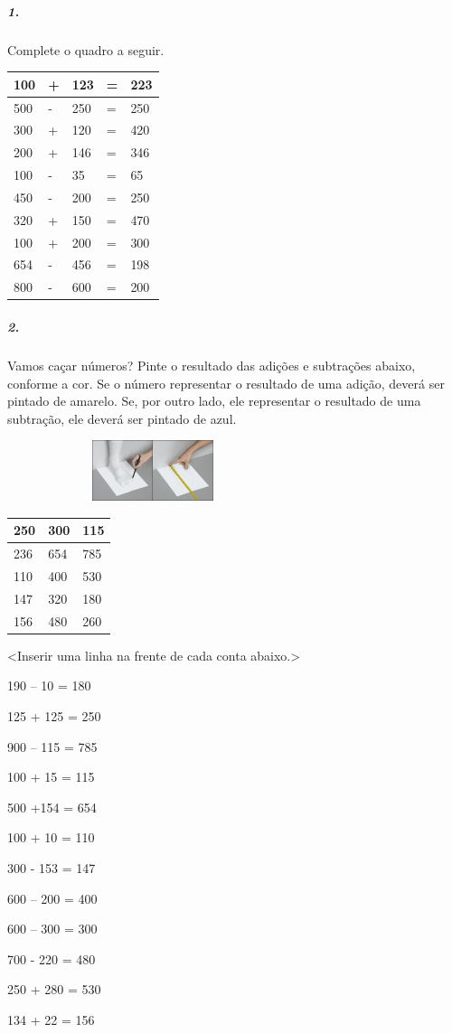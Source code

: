 \subparagraph{1. }\label{section-14}

Complete o quadro a seguir.

\begin{longtable}[]{@{}lllll@{}}
\toprule
100 & + & 123 & = & 223\tabularnewline
\midrule
\endhead
500 & - & 250 & = & 250\tabularnewline
300 & + & 120 & = & 420\tabularnewline
200 & + & 146 & = & 346\tabularnewline
100 & - & 35 & = & 65\tabularnewline
450 & - & 200 & = & 250\tabularnewline
320 & + & 150 & = & 470\tabularnewline
100 & + & 200 & = & 300\tabularnewline
654 & - & 456 & = & 198\tabularnewline
800 & - & 600 & = & 200\tabularnewline
\bottomrule
\end{longtable}

\subparagraph{2. }\label{section-15}

Vamos caçar números? Pinte o resultado das adições e subtrações abaixo,
conforme a cor. Se o número representar o resultado de uma adição, deverá ser pintado de amarelo. Se, por outro lado, ele representar o resultado de uma subtração, ele deverá ser pintado de azul.

\includegraphics[width=3.35417in,height=0.69792in]{media/image29.png}

\begin{longtable}[]{@{}lll@{}}
\toprule
250 & 300 & 115\tabularnewline
\midrule
\endhead
236 & 654 & 785\tabularnewline
110 & 400 & 530\tabularnewline
147 & 320 & 180\tabularnewline
156 & 480 & 260\tabularnewline
\bottomrule
\end{longtable}

\textless{}Inserir uma linha na frente de cada conta
abaixo.\textgreater{}

190 -- 10 = 180

125 + 125 = 250

900 -- 115 = 785

100 + 15 = 115

500 +154 = 654

100 + 10 = 110

300 - 153 = 147

600 -- 200 = 400

600 -- 300 = 300

700 - 220 = 480

250 + 280 = 530

134 + 22 = 156


